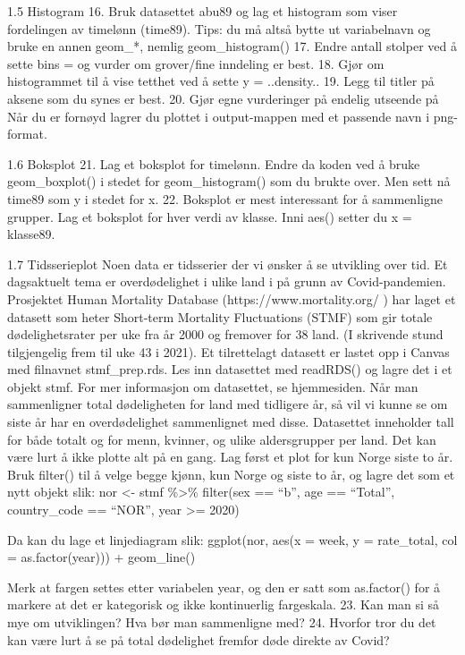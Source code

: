 \documentclass[
  letterpaper,
  DIV=11,
  numbers=noendperiod]{scrreprt}
\begin{document}
1.5 Histogram 16. Bruk datasettet abu89 og lag et histogram som viser
fordelingen av timelønn (time89). Tips: du må altså bytte ut
variabelnavn og bruke en annen geom\_*, nemlig geom\_histogram() 17.
Endre antall stolper ved å sette bins = og vurder om grover/fine
inndeling er best. 18. Gjør om histogrammet til å vise tetthet ved å
sette y = ..density.. 19. Legg til titler på aksene som du synes er
best. 20. Gjør egne vurderinger på endelig utseende på Når du er fornøyd
lagrer du plottet i output-mappen med et passende navn i png-format.

1.6 Boksplot 21. Lag et boksplot for timelønn. Endre da koden ved å
bruke geom\_boxplot() i stedet for geom\_histogram() som du brukte over.
Men sett nå time89 som y i stedet for x. 22. Boksplot er mest
interessant for å sammenligne grupper. Lag et boksplot for hver verdi av
klasse. Inni aes() setter du x = klasse89.

1.7 Tidsserieplot Noen data er tidsserier der vi ønsker å se utvikling
over tid. Et dagsaktuelt tema er overdødelighet i ulike land i på grunn
av Covid-pandemien. Prosjektet Human Mortality Database
(https://www.mortality.org/ ) har laget et datasett som heter Short-term
Mortality Fluctuations (STMF) som gir totale dødelighetsrater per uke
fra år 2000 og fremover for 38 land. (I skrivende stund tilgjengelig
frem til uke 43 i 2021). Et tilrettelagt datasett er lastet opp i Canvas
med filnavnet stmf\_prep.rds. Les inn datasettet med readRDS() og lagre
det i et objekt stmf. For mer informasjon om datasettet, se hjemmesiden.
Når man sammenligner total dødeligheten for land med tidligere år, så
vil vi kunne se om siste år har en overdødelighet sammenlignet med
disse. Datasettet inneholder tall for både totalt og for menn, kvinner,
og ulike aldersgrupper per land. Det kan være lurt å ikke plotte alt på
en gang. Lag først et plot for kun Norge siste to år. Bruk filter() til
å velge begge kjønn, kun Norge og siste to år, og lagre det som et nytt
objekt slik: nor \textless- stmf \%\textgreater\% filter(sex == ``b'',
age == ``Total'', country\_code == ``NOR'', year \textgreater= 2020)

Da kan du lage et linjediagram slik: ggplot(nor, aes(x = week, y =
rate\_total, col = as.factor(year))) + geom\_line()

Merk at fargen settes etter variabelen year, og den er satt som
as.factor() for å markere at det er kategorisk og ikke kontinuerlig
fargeskala. 23. Kan man si så mye om utviklingen? Hva bør man
sammenligne med? 24. Hvorfor tror du det kan være lurt å se på total
dødelighet fremfor døde direkte av Covid?
\end{document}
